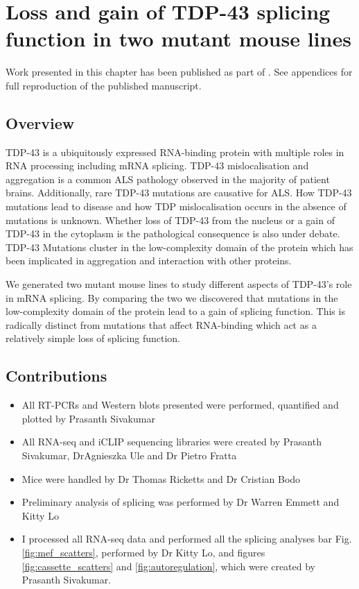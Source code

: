 \chapter{Loss and gain of TDP-43 splicing function in two mutant mouse lines}
\label{chapter:tdp_mice}

Work presented in this chapter has been published as part of \citep{Fratta2018}. See appendices for full reproduction of the published manuscript.

\section{Overview}

TDP-43 is a ubiquitously expressed RNA-binding protein with multiple roles in RNA processing including mRNA splicing.
TDP-43 mislocalisation and aggregation is a common ALS pathology observed in the majority of patient brains.
Additionally, rare  TDP-43 mutations are causative for ALS. 
How TDP-43 mutations lead to disease and how TDP mislocalisation occurs in the absence of mutations is unknown. 
Whether loss of TDP-43 from the nucleus or a gain of TDP-43 in the cytoplasm is the pathological consequence is also under debate.
TDP-43 Mutations cluster in the low-complexity domain of the protein which has been implicated in aggregation and interaction with other proteins.

We generated two mutant mouse lines to study different aspects of TDP-43's role in mRNA splicing.
By comparing the two we discovered that mutations in the low-complexity domain of the protein lead to a gain of splicing function. 
This is radically distinct from mutations that affect RNA-binding which act as a relatively simple loss of splicing function.


\section{Contributions}
\begin{itemize}
	\item All RT-PCRs and Western blots presented were performed, quantified and plotted by Prasanth Sivakumar
	\item All RNA-seq and iCLIP sequencing libraries were created by Prasanth Sivakumar, DrAgnieszka Ule and Dr Pietro Fratta
	\item Mice were handled by Dr Thomas Ricketts and Dr Cristian Bodo
	\item Preliminary analysis of splicing was performed by Dr Warren Emmett and Kitty Lo
	\item I processed all RNA-seq data and performed all the splicing analyses bar Fig. \ref{fig:mef_scatters}, performed by Dr Kitty Lo, and figures \ref{fig:cassette_scatters} and \ref{fig:autoregulation}, which were created by Prasanth Sivakumar.
\end{itemize}




